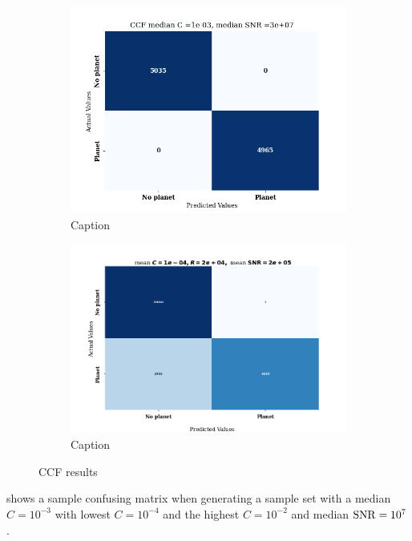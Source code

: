 \begin{figure}[!ht]
    \centering
\begin{subfigure}{0.4\textwidth}
    \includegraphics[scale =0.5]{images/Chapter3/confusion_ccf_1e-04_cmax_1e-02_dsnrmin_1e+07_dsnrmax_1e+08.png}
    \caption{Caption}
    \label{fig:ccf_cm}
\end{subfigure}
\hfill
\begin{subfigure}{0.4\textwidth}
    \includegraphics[scale=0.28]{images/Chapter3/ccf_cm_cmin_1e-5_cmax_1e-3_snrmin_1e5_snmax_1e6_R_20000.png}
    \caption{Caption}
    \label{fig:high contrast-ccf cm}
\end{subfigure}
\caption{CCF results}
\end{figure}
 shows a sample confusing matrix when generating a sample set with a median $C=10^{-3}$ with lowest $C=10^{-4}$ and the highest $C=10^{-2}$ and median $\rm{SNR}=10^{7}$.
